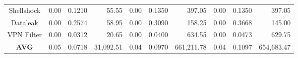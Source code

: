 \begin{table*}[t]
{\begin{tabular}{crrrrrrrrr}
Shellshock           & 0.00                                                              & 0.1210                                                              & 55.55                                                               & 0.00                                                              & 0.1350                                                              & 397.05                                                              & 0.00                                                              & 0.1350                                                              & 397.05                                                              \\ 
Dataleak             & 0.00                                                              & 0.2574                                                              & 58.95                                                               & 0.00                                                              & 0.3090                                                              & 158.25                                                              & 0.00                                                              & 0.3668                                                              & 145.00                                                              \\ 
VPN Filter            & 0.00                                                              & 0.0312                                                              & 20.65                                                               & 0.00                                                              & 0.0400                                                              & 634.55                                                              & 0.00                                                              & 0.0473                                                              & 629.75                                                              \\ 
\textbf{AVG}         & 0.05                                                              & 0.0718                                                              & 31,092.51                                                           & 0.04                                                              & 0.0970                                                              & 661,211.78                                                          & 0.04                                                              & 0.1097                                                              & 654,683.47                                                          \\ \hline
\end{tabular}
}
\end{table*}